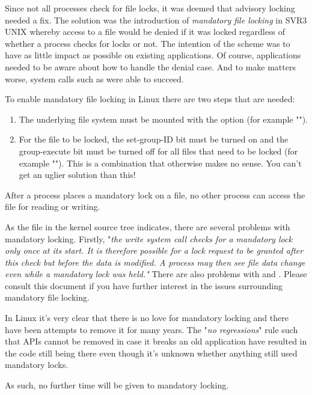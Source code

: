 Since not all processes check for file locks, it was deemed that advisory locking needed a fix. The solution was the introduction of \textit{mandatory file locking} in SVR3 UNIX whereby access to a file would be denied if it was locked regardless of whether a process checks for locks or not. The intention of the scheme was to have as little impact as possible on existing applications. Of course, applications needed to be aware about how to handle the denial case. And to make matters worse, system calls such as  were able to succeed.

To enable mandatory file locking in Linux there are two steps that are needed:

\begin{enumerate}
	\item The underlying file system must be mounted with the  option (for example "").
	\item For the file to be locked, the set-group-ID bit must be turned on and the group-execute bit must be turned off for all
		files that need to be locked (for example ""). This is a combination that otherwise makes
		no sense. You can't get an uglier solution than this!
\end{enumerate}

\noindent
After a process places a mandatory lock on a file, no other process can access the file for reading or writing. 

As the  file in the kernel source tree indicates, there are several problems with mandatory locking. Firstly, "\textit{the write system call checks for a mandatory lock only once at its start.  It is therefore possible for a lock request to be granted after this check but before the data is modified. A process may then see file data change even while a mandatory lock was held."} There are also problems with  and . Please consult this document if you have further interest in the issues surrounding mandatory file locking.

In Linux it's very clear that there is no love for mandatory locking and there have been attempts to remove it for many years. The "\textit{no regressions}" rule such that APIs cannot be removed in case it breaks an old application have resulted in the code still being there even though it's unknown whether anything still used mandatory locks.

As such, no further time will be given to mandatory locking.

